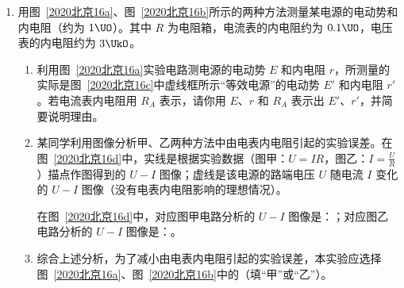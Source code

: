 \documentclass[\gkver]{gaokaozhenti}
\begin{document}
\begin{enumerate}
{\begin{enumerate}
	\item
	所作 $a-\frac{1}{M}$ 图像见详解。

	\item
	AD

\end{enumerate}
}

\item
用图~\ref{2020北京16a}、图~\ref{2020北京16b}所示的两种方法测量某电源的电动势和内电阻（约为 $1\UO$）。其中 $R$ 为电阻箱，电流表的内电阻约为 $0.1\UO$，电压表的内电阻约为 $3\UkO$。

\begin{enumerate}
	\item
	利用图~\ref{2020北京16a}实验电路测电源的电动势 $E$ 和内电阻 $r$，所测量的实际是图~\ref{2020北京16c}中虚线框所示“等效电源”的电动势 $E'$ 和内电阻 $r'$。若电流表内电阻用 $R_{A}$ 表示，请你用 $E$、$r$ 和 $R_{A}$ 表示出 $E'$、$r'$，并简要说明理由。
	\item
	某同学利用图像分析甲、乙两种方法中由电表内电阻引起的实验误差。在图~\ref{2020北京16d}中，实线是根据实验数据（图甲：$U=IR$，图乙：$I=\frac{U}{R}$）描点作图得到的 $U-I$ 图像；虚线是该电源的路端电压 $U$ 随电流 $I$ 变化的 $U-I$ 图像（没有电表内电阻影响的理想情况）。
	
	在图~\ref{2020北京16d}中，对应图甲电路分析的 $U-I$ 图像是：；对应图乙电路分析的 $U-I$ 图像是：。
	\item
	综合上述分析，为了减小由电表内电阻引起的实验误差，本实验应选择图~\ref{2020北京16a}、图~\ref{2020北京16b}中的（填“甲”或“乙”）。
\end{enumerate}


\end{enumerate}
\end{document}
